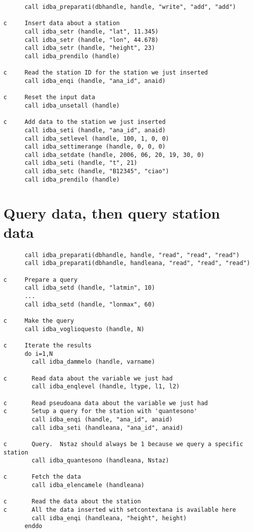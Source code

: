\documentclass[final,12pt,a4paper,twoside]{book}
\begin{document}
\begin{verbatim}
      call idba_preparati(dbhandle, handle, "write", "add", "add")
      
c     Insert data about a station
      call idba_setr (handle, "lat", 11.345)
      call idba_setr (handle, "lon", 44.678)
      call idba_setr (handle, "height", 23)
      call idba_prendilo (handle)

c     Read the station ID for the station we just inserted
      call idba_enqi (handle, "ana_id", anaid)

c     Reset the input data
      call idba_unsetall (handle)

c     Add data to the station we just inserted
      call idba_seti (handle, "ana_id", anaid)
      call idba_setlevel (handle, 100, 1, 0, 0)
      call idba_settimerange (handle, 0, 0, 0)
      call idba_setdate (handle, 2006, 06, 20, 19, 30, 0)
      call idba_seti (handle, "t", 21)
      call idba_setc (handle, "B12345", "ciao")
      call idba_prendilo (handle)
\end{verbatim}


\section{Query data, then query station data}

\begin{verbatim}
      call idba_preparati(dbhandle, handle, "read", "read", "read")
      call idba_preparati(dbhandle, handleana, "read", "read", "read")
      
c     Prepare a query
      call idba_setd (handle, "latmin", 10)
      ...
      call idba_setd (handle, "lonmax", 60)

c     Make the query
      call idba_voglioquesto (handle, N)

c     Iterate the results
      do i=1,N
        call idba_dammelo (handle, varname)

c       Read data about the variable we just had
        call idba_enqlevel (handle, ltype, l1, l2)

c       Read pseudoana data about the variable we just had
c       Setup a query for the station with 'quantesono'
        call idba_enqi (handle, "ana_id", anaid)
        call idba_seti (handleana, "ana_id", anaid)

c       Query.  Nstaz should always be 1 because we query a specific station
        call idba_quantesono (handleana, Nstaz)

c       Fetch the data
        call idba_elencamele (handleana)

c       Read the data about the station
c       All the data inserted with setcontextana is available here
        call idba_enqi (handleana, "height", height)
      enddo
\end{verbatim}
\end{document}
